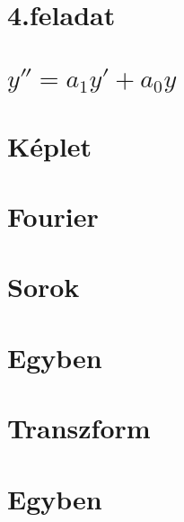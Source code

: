 \begin{spacing}{1.4}
\section*{4.feladat} \label{DBodeber4Mo}
\Mo{

}
\vspace{0.5cm}
\newpage
\section*{$y''= a_1 y' + a_0 y$} \label{DBodemaholke}
\vspace{0.5cm}
\newpage
\section*{Képlet} \label{DBodemaholkeSum}
\Desc{

}
\vspace{0.5cm}
\newpage
\section*{Fourier} \label{DBfourier}
\newline
{}
\vspace{0.5cm}
\newpage
\section*{Sorok} \label{DBfouriersor}
\vspace{0.5cm}
\newpage
\section*{Egyben} \label{DBfouriersorsum}
\Desc{

}
\vspace{0.5cm}
\newpage
\section*{Transzform} \label{DBfouriertransz}
\vspace{0.5cm}
\newpage
\section*{Egyben} \label{DBfouriertranszsum}
\Desc{

}
\vspace{0.5cm}
\newpage

\end{spacing}
